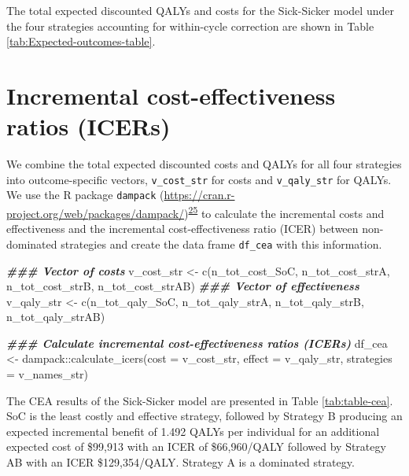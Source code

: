 \documentclass[
]{article}
\newenvironment{Shaded}{\begin{snugshade}}{\end{snugshade}}
\newcommand{\AttributeTok}[1]{\textcolor[rgb]{0.77,0.63,0.00}{#1}}
\newcommand{\DocumentationTok}[1]{\textcolor[rgb]{0.56,0.35,0.01}{\textbf{\textit{#1}}}}
\newcommand{\FunctionTok}[1]{\textcolor[rgb]{0.00,0.00,0.00}{#1}}
\newcommand{\NormalTok}[1]{#1}
\newcommand{\OtherTok}[1]{\textcolor[rgb]{0.56,0.35,0.01}{#1}}
\newcommand{\SpecialCharTok}[1]{\textcolor[rgb]{0.00,0.00,0.00}{#1}}
\begin{document}
The total expected discounted QALYs and costs for the Sick-Sicker model under the four strategies accounting for within-cycle correction are shown in Table \ref{tab:Expected-outcomes-table}.

\hypertarget{incremental-cost-effectiveness-ratios-icers}{%
\section{Incremental cost-effectiveness ratios (ICERs)}\label{incremental-cost-effectiveness-ratios-icers}}

We combine the total expected discounted costs and QALYs for all four strategies into outcome-specific vectors, \texttt{v\_cost\_str} for costs and \texttt{v\_qaly\_str} for QALYs. We use the R package \texttt{dampack} (\url{https://cran.r-project.org/web/packages/dampack/})\textsuperscript{\protect\hyperlink{ref-Alarid-Escudero2021}{25}} to calculate the incremental costs and effectiveness and the incremental cost-effectiveness ratio (ICER) between non-dominated strategies and create the data frame \texttt{df\_cea} with this information.

\begin{Shaded}
\begin{Highlighting}[]
\DocumentationTok{\#\#\# Vector of costs}
\NormalTok{v\_cost\_str }\OtherTok{\textless{}{-}} \FunctionTok{c}\NormalTok{(n\_tot\_cost\_SoC, n\_tot\_cost\_strA, n\_tot\_cost\_strB, n\_tot\_cost\_strAB)}
\DocumentationTok{\#\#\# Vector of effectiveness}
\NormalTok{v\_qaly\_str }\OtherTok{\textless{}{-}} \FunctionTok{c}\NormalTok{(n\_tot\_qaly\_SoC, n\_tot\_qaly\_strA, n\_tot\_qaly\_strB, n\_tot\_qaly\_strAB)}

\DocumentationTok{\#\#\# Calculate incremental cost{-}effectiveness ratios (ICERs)}
\NormalTok{df\_cea }\OtherTok{\textless{}{-}}\NormalTok{ dampack}\SpecialCharTok{::}\FunctionTok{calculate\_icers}\NormalTok{(}\AttributeTok{cost =}\NormalTok{ v\_cost\_str, }
                                   \AttributeTok{effect =}\NormalTok{ v\_qaly\_str,}
                                   \AttributeTok{strategies =}\NormalTok{ v\_names\_str)}
\end{Highlighting}
\end{Shaded}

The CEA results of the Sick-Sicker model are presented in Table \ref{tab:table-cea}. SoC is the least costly and effective strategy, followed by Strategy B producing an expected incremental benefit of 1.492 QALYs per individual for an additional expected cost of \$99,913 with an ICER of \$66,960/QALY followed by Strategy AB with an ICER \$129,354/QALY. Strategy A is a dominated strategy.
\end{document}
